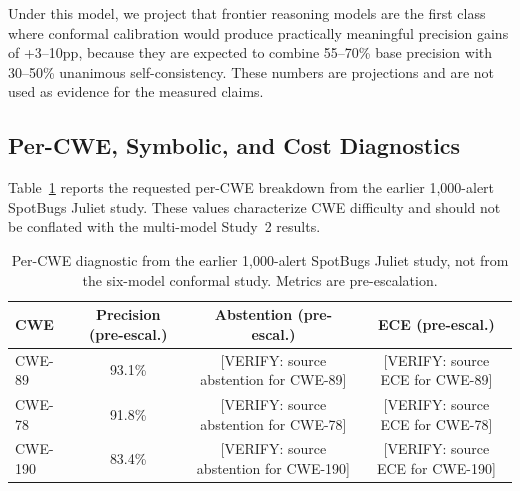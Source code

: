 \begin{table}[t]
\centering
\caption{RQ5 projected frontier outlook. These are estimates, not measured EVICT results. Ranges retain the provided uncertainty and should be read as testable hypotheses.}
\label{tab:frontier_proj}
\small
\setlength{\tabcolsep}{4pt}
\end{table}

Under this model, we project that frontier reasoning models are the first class where conformal calibration would produce practically meaningful precision gains of +3--10pp, because they are expected to combine 55--70\% base precision with 30--50\% unanimous self-consistency. These numbers are projections and are not used as evidence for the measured claims.

\subsection{Per-CWE, Symbolic, and Cost Diagnostics}

Table~\ref{tab:per_cwe_main} reports the requested per-CWE breakdown from the earlier 1,000-alert SpotBugs Juliet study. These values characterize CWE difficulty and should not be conflated with the multi-model Study~2 results.

\begin{table}[t]
\centering
\caption{Per-CWE diagnostic from the earlier 1,000-alert SpotBugs Juliet study, not from the six-model conformal study. Metrics are pre-escalation.}
\label{tab:per_cwe_main}
\small
\begin{tabular}{lccc}
\toprule
\textbf{CWE} & \textbf{Precision (pre-escal.)} & \textbf{Abstention (pre-escal.)} & \textbf{ECE (pre-escal.)} \\
\midrule
CWE-89 & 93.1\% & [VERIFY: source abstention for CWE-89] & [VERIFY: source ECE for CWE-89] \\
CWE-78 & 91.8\% & [VERIFY: source abstention for CWE-78] & [VERIFY: source ECE for CWE-78] \\
CWE-190 & 83.4\% & [VERIFY: source abstention for CWE-190] & [VERIFY: source ECE for CWE-190] \\
\bottomrule
\end{tabular}
\end{table}

